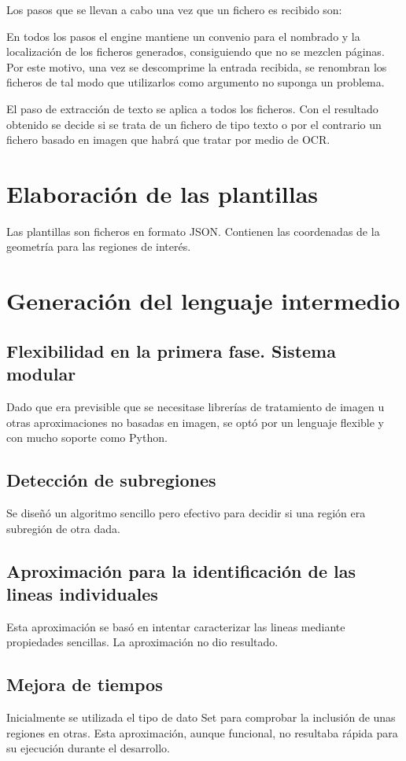 Los pasos que se llevan a cabo una vez que un fichero es recibido son:



En todos los pasos el engine mantiene un convenio para el nombrado y la localización de los ficheros generados, consiguiendo que no se mezclen páginas. Por este motivo, una vez se descomprime la entrada recibida, se renombran los ficheros de tal modo que utilizarlos como argumento no suponga un problema.

El paso de extracción de texto se aplica a todos los ficheros. Con el resultado obtenido se decide si se trata de un fichero de tipo texto o por el contrario un fichero basado en imagen que habrá que tratar por medio de OCR.
\section{Elaboración de las plantillas}
Las plantillas son ficheros en formato JSON. Contienen las coordenadas de la geometría para las regiones de interés.
\section{Generación del lenguaje intermedio}
\subsection{Flexibilidad en la primera fase. Sistema modular}
Dado que era previsible que se necesitase librerías de tratamiento de imagen u otras aproximaciones no basadas en imagen, se optó por un lenguaje flexible y con mucho soporte como Python.
\subsection{Detección de subregiones}
Se diseñó un algoritmo sencillo pero efectivo para decidir si una región era subregión de otra dada.
\subsection{Aproximación para la identificación de las lineas individuales}
Esta aproximación se basó en intentar caracterizar las lineas mediante propiedades sencillas. La aproximación no dio resultado.
\subsection{Mejora de tiempos}
Inicialmente se utilizada el tipo de dato Set para comprobar la inclusión de unas regiones en otras. Esta aproximación, aunque funcional, no resultaba rápida para su ejecución durante el desarrollo.

